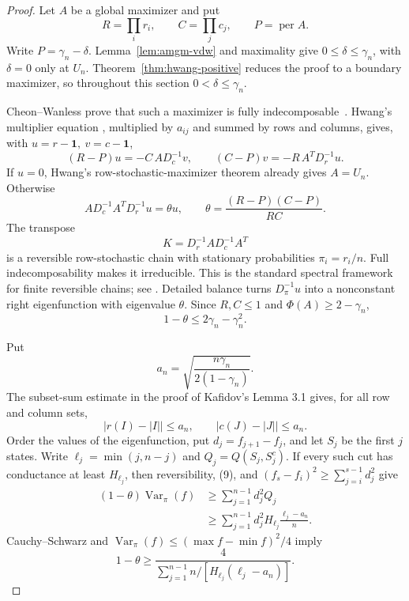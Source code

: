 \documentclass[10pt,a4paper]{amsart}
\theoremstyle{definition}
\theoremstyle{remark}
\begin{document}
\begin{proof}
Let \(A\) be a global maximizer and put
\[
 R=\prod_i r_i,\qquad C=\prod_jc_j,\qquad P=\operatorname{per}A.
\]
Write \(P=\gamma_n-\delta\).  Lemma~\ref{lem:amgm-vdw} and maximality
give \(0\leq\delta\leq\gamma_n\), with \(\delta=0\) only at \(U_n\).
Theorem~\ref{thm:hwang-positive} reduces the proof to a boundary maximizer,
so throughout this section \(0<\delta\leq\gamma_n\).

Cheon--Wanless prove that such a maximizer is fully
indecomposable~\cite[Theorem 3.2]{CW}. Hwang's multiplier equation
\cite[Lemmas 3.5--3.6]{CW}, multiplied by \(a_{ij}\) and summed by rows and
columns, gives, with \(u=r-\mathbf1,\ v=c-\mathbf1\),
\[
 (R-P)u=-C\,AD_c^{-1}v,\qquad
 (C-P)v=-R\,A^TD_r^{-1}u.                          \tag{6}
\]
If \(u=0\), Hwang's row-stochastic-maximizer theorem already gives \(A=U_n\).
Otherwise
\[
 AD_c^{-1}A^TD_r^{-1}u=\theta u,\qquad
 \theta=\frac{(R-P)(C-P)}{RC}.                     \tag{7}
\]
The transpose
\[
 \widehat K=D_r^{-1}AD_c^{-1}A^T
\]
is a reversible row-stochastic chain with stationary probabilities
\(\pi_i=r_i/n\). Full indecomposability makes it irreducible.  This is the standard
spectral framework for finite reversible chains; see \cite{LevinPeres}.
Detailed balance turns \(D_\pi^{-1}u\) into a nonconstant right eigenfunction with
eigenvalue \(\theta\). Since \(R,C\leq1\) and
\(\Phi(A)\geq2-\gamma_n\),
\[
 1-\theta\leq2\gamma_n-\gamma_n^2.                 \tag{8}
\]

Put
\[
 a_n=\sqrt{\frac{n\gamma_n}{2(1-\gamma_n)}}.
\]
The subset-sum estimate in the proof of Kafidov's Lemma 3.1 gives, for all
row and column sets,
\[
 |r(I)-|I||\leq a_n,\qquad |c(J)-|J||\leq a_n.      \tag{9}
\]
Order the values of the eigenfunction, put \(d_j=f_{j+1}-f_j\), and let
\(S_j\) be the first \(j\) states. Write
\(\ell_j=\min(j,n-j)\) and \(Q_j=Q(S_j,S_j^c)\). If every such cut has
conductance at least \(H_{\ell_j}\), then reversibility, (9), and
\((f_s-f_i)^2\geq\sum_{j=i}^{s-1}d_j^2\) give
\[
\begin{split}
(1-\theta)\operatorname{Var}_\pi(f)
&\geq\sum_{j=1}^{n-1}d_j^2Q_j\\
&\geq\sum_{j=1}^{n-1}d_j^2
 H_{\ell_j}\frac{\ell_j-a_n}{n}.
\end{split}
\]
Cauchy--Schwarz and
\(\operatorname{Var}_\pi(f)\leq(\max f-\min f)^2/4\) imply
\[
1-\theta\geq
\frac4{\displaystyle\sum_{j=1}^{n-1}
 n/[H_{\ell_j}(\ell_j-a_n)]}.                      \tag{10}
\]


\end{proof}
\end{document}
